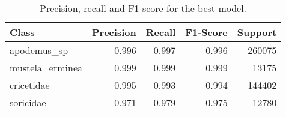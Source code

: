 \begin{table}[H]
\centering
\caption{Precision, recall and F1-score for the best model.}
\label{tab:precision_recall_fscore_support}
\begin{tabular}{l r r r r}
\toprule
Class & Precision & Recall & F1-Score & Support \\
\midrule
apodemus\_sp & 0.996 & 0.997 & 0.996 & 260075 \\
mustela\_erminea & 0.999 & 0.999 & 0.999 & 13175 \\
cricetidae & 0.995 & 0.993 & 0.994 & 144402 \\
soricidae & 0.971 & 0.979 & 0.975 & 12780 \\
\bottomrule
\end{tabular}
\end{table}